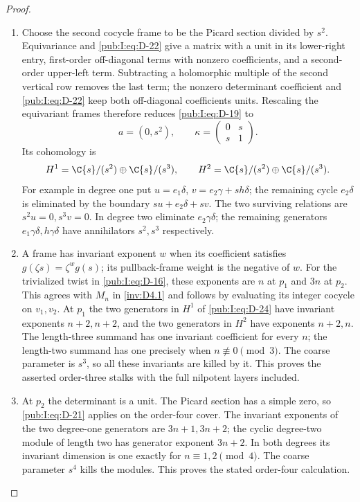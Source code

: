\begin{proof}
\begin{enumerate}[label=\arabic*.,leftmargin=*]
\item Choose the second cocycle frame to be the Picard section divided by
$s^2$. Equivariance and \eqref{pub:I:eq:D-22} give a matrix with a unit in its
lower-right entry, first-order off-diagonal terms with nonzero
coefficients, and a second-order upper-left term. Subtracting a
holomorphic multiple of the second vertical row removes the last
term; the nonzero determinant coefficient and \eqref{pub:I:eq:D-22} keep both
off-diagonal coefficients units. Rescaling the equivariant frames
therefore reduces \eqref{pub:I:eq:D-19} to
\begin{equation}
 a=(0,s^2),\qquad \kappa=\begin{pmatrix}0&s\\s&1\end{pmatrix}.
\label{pub:I:eq:D-23}
\end{equation}
Its cohomology is
\begin{equation}
 H^1=\C\{s\}/(s^2)\oplus\C\{s\}/(s^3),\qquad
 H^2=\C\{s\}/(s^2)\oplus\C\{s\}/(s^3).
\label{pub:I:eq:D-24}
\end{equation}
For example in degree one put
$u=e_1\delta$, $v=e_2\gamma+s h\delta$; the remaining cycle
$e_2\delta$ is eliminated by the boundary
$s u+e_2\delta+s v$. The two surviving relations are
$s^2u=0,s^3v=0$. In degree two eliminate $e_2\gamma\delta$;
the remaining generators $e_1\gamma\delta,h\gamma\delta$
have annihilators $s^2,s^3$ respectively.

\item A frame has invariant exponent $w$ when its coefficient satisfies
$g(\zeta s)=\zeta^w g(s)$; its pullback-frame weight is the negative
of $w$. For the trivialized twist in \eqref{pub:I:eq:D-16}, these exponents are
$n$ at $p_1$ and $3n$ at $p_2$. This agrees with $M_n$ in \ref{inv:D4.1}
and follows by evaluating its integer cocycle on $v_1,v_2$.
At $p_1$ the two generators in $H^1$ of \eqref{pub:I:eq:D-24} have invariant
exponents $n+2,n+2$, and the two generators in $H^2$ have exponents
$n+2,n$. The length-three summand has one invariant coefficient
for every $n$; the length-two summand has one precisely when
$n\not\equiv0\pmod3$. The coarse parameter is $s^3$, so all these
invariants are killed by it. This proves the asserted order-three
stalks with the full nilpotent layers included.

\item At $p_2$ the determinant is a unit. The Picard section has a simple
zero, so \eqref{pub:I:eq:D-21} applies on the order-four cover. The invariant
exponents of the two degree-one generators are $3n+1,3n+2$;
the cyclic degree-two module of length two has generator exponent
$3n+2$. In both degrees its invariant dimension is one exactly for
$n\equiv1,2\pmod4$. The coarse parameter $s^4$ kills the modules.
This proves the stated order-four calculation. \end{enumerate}
\end{proof}